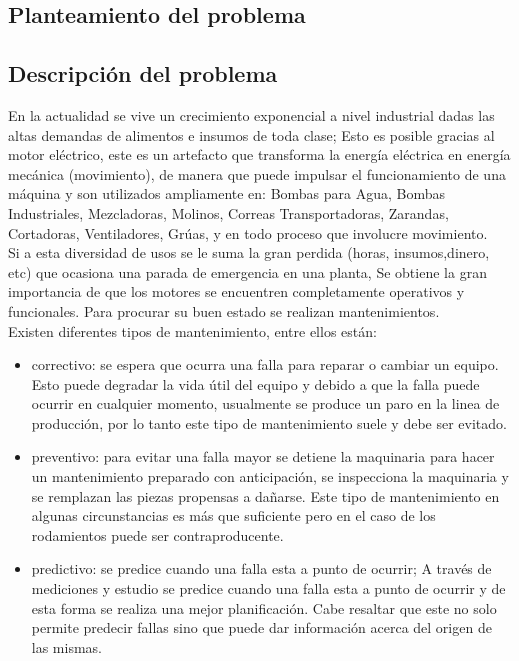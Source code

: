 \setcounter{page}{1}

\begin{center}
	\section{Planteamiento del problema}
\end{center}


\subsection{Descripción del problema}

	En la actualidad se vive un crecimiento exponencial a nivel industrial dadas las altas demandas de alimentos e insumos de toda clase; Esto es posible gracias al motor eléctrico, este es un artefacto que transforma la energía eléctrica en energía mecánica (movimiento), de manera que puede impulsar el funcionamiento de una máquina y son utilizados ampliamente en: Bombas para Agua, Bombas Industriales, Mezcladoras, Molinos, Correas Transportadoras, Zarandas, Cortadoras, Ventiladores, Grúas, y en todo proceso que involucre movimiento.\\
	Si a esta diversidad de usos se le suma la gran perdida (horas, insumos,dinero, etc) que ocasiona una parada de emergencia en una planta, Se obtiene la gran importancia de que los motores se encuentren completamente operativos y funcionales. Para procurar su buen estado se realizan mantenimientos.\\



	Existen diferentes tipos de mantenimiento, entre ellos están: 
	\begin{itemize}
		\item correctivo: se espera que ocurra una falla para
	reparar o cambiar un equipo. Esto puede degradar la vida útil del equipo y debido a que la falla puede ocurrir en cualquier momento, usualmente se produce un paro en la linea de producción, por lo tanto este tipo de mantenimiento suele y debe ser evitado.

		\item preventivo: para evitar una falla mayor se detiene la maquinaria para hacer un mantenimiento preparado con anticipación, se inspecciona la maquinaria y se remplazan las piezas propensas a dañarse. Este tipo de mantenimiento en algunas circunstancias es más que suficiente pero en el caso de los rodamientos puede ser contraproducente.

		\item predictivo: se predice cuando una falla esta a punto de ocurrir; A través de mediciones y estudio se predice cuando una falla esta a punto de ocurrir y de esta forma se realiza una mejor planificación. Cabe resaltar que este no solo permite predecir fallas sino que puede dar
		información acerca del origen de las mismas.
	\end{itemize}

